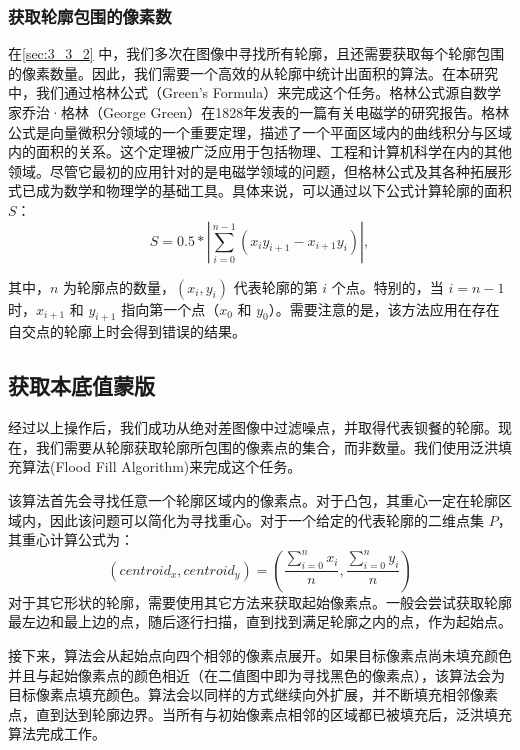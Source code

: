\subsubsection{获取轮廓包围的像素数}

在\cref{sec:3_3_2} 中，我们多次在图像中寻找所有轮廓，且还需要获取每个轮廓包围的像素数量。因此，我们需要一个高效的从轮廓中统计出面积的算法。在本研究中，我们通过格林公式（Green's Formula）来完成这个任务。格林公式源自数学家乔治·格林（George Green）在1828年发表的一篇有关电磁学的研究报告\cite{green2014}。格林公式是向量微积分领域的一个重要定理，描述了一个平面区域内的曲线积分与区域内的面积的关系。这个定理被广泛应用于包括物理、工程和计算机科学在内的其他领域。尽管它最初的应用针对的是电磁学领域的问题，但格林公式及其各种拓展形式已成为数学和物理学的基础工具。具体来说，可以通过以下公式计算轮廓的面积$S$：
\begin{equation}
    S = 0.5 * |\sum_{i=0}^{n-1}(x_i y_{i+1} - x_{i+1} y_i)|,
\end{equation}

其中，$n$ 为轮廓点的数量，$(x_i, y_i)$ 代表轮廓的第 $i$ 个点。特别的，当 $i=n-1$ 时，$x_{i+1}$ 和 $y_{i+1}$ 指向第一个点（$x_0$ 和 $y_0$）。需要注意的是，该方法应用在存在自交点的轮廓上时会得到错误的结果。

\subsection{获取本底值蒙版}

经过以上操作后，我们成功从绝对差图像中过滤噪点，并取得代表钡餐的轮廓。现在，我们需要从轮廓获取轮廓所包围的像素点的集合，而非数量。我们使用泛洪填充算法(Flood Fill Algorithm)来完成这个任务。

该算法首先会寻找任意一个轮廓区域内的像素点。对于凸包，其重心一定在轮廓区域内，因此该问题可以简化为寻找重心。对于一个给定的代表轮廓的二维点集 $P$，其重心计算公式为：
\begin{equation}
    (centroid_x, centroid_y) = (\frac{\sum_{i=0}^{n}x_i}{n},\frac{\sum_{i=0}^{n}y_i}{n}) 
\end{equation}
对于其它形状的轮廓，需要使用其它方法来获取起始像素点。一般会尝试获取轮廓最左边和最上边的点，随后逐行扫描，直到找到满足轮廓之内的点，作为起始点。

接下来，算法会从起始点向四个相邻的像素点展开。如果目标像素点尚未填充颜色并且与起始像素点的颜色相近（在二值图中即为寻找黑色的像素点），该算法会为目标像素点填充颜色。算法会以同样的方式继续向外扩展，并不断填充相邻像素点，直到达到轮廓边界。当所有与初始像素点相邻的区域都已被填充后，泛洪填充算法完成工作。

